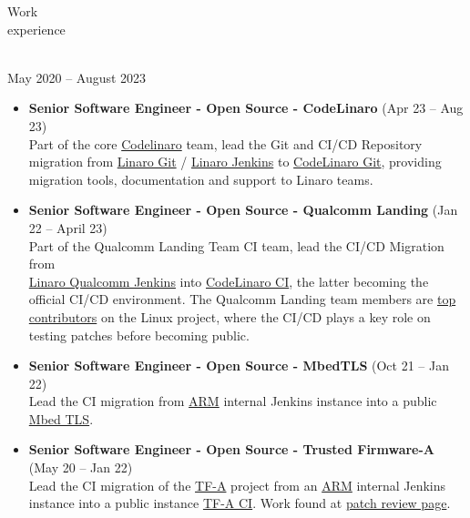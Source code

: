 \documentclass{resume}
\def\linaro{Linaro Limited}
\begin{document}
\begin{category}{Work \\experience}

  \citem{\linaro}\\
  May 2020 -- August 2023

  \begin{itemize}
  \item \textbf{Senior Software Engineer - Open Source - CodeLinaro} (Apr 23 -- Aug 23)\\
    Part of the core \href{www.codelinaro.org}{Codelinaro} team, lead the Git and CI/CD Repository migration
    from \href{git.linaro.org}{Linaro Git} / \href{ci.linaro.org}{Linaro Jenkins} to
    \href{git.codelinaro.org}{CodeLinaro Git}, providing migration tools, documentation and support to Linaro teams.
  \end{itemize}

  \begin{itemize}
  \item \textbf{Senior Software Engineer - Open Source - Qualcomm Landing} (Jan 22 -- April 23)\\
    Part of the Qualcomm Landing Team CI team, lead the CI/CD Migration from \\
    \href{https://ci.linaro.org/view/qclt/}{Linaro Qualcomm Jenkins} into
    \href{https://git.codelinaro.org/linaro/qcomlt/ci/configs}{CodeLinaro CI}, the latter becoming the official CI/CD environment.
    The Qualcomm Landing team members are \href{https://kernelnewbies.org/DevelopmentStatistics}{top contributors} on the Linux project,
    where the CI/CD plays a key role on testing patches before becoming public.
  \end{itemize}

  \begin{itemize}
  \item \textbf{Senior Software Engineer - Open Source - MbedTLS} (Oct 21 -- Jan 22)\\
    Lead the CI migration from \href{https://www.arm.com/}{ARM} internal Jenkins instance into a public \href{https://github.com/ARMmbed/mbedtls}{Mbed TLS}.
  \end{itemize}

  \begin{itemize}
  \item \textbf{Senior Software Engineer - Open Source - Trusted Firmware-A} (May 20 -- Jan 22)\\
    Lead the CI migration of the \href{https://www.trustedfirmware.org/projects/tf-a/}{TF-A}
    project from an \href{https://www.arm.com/}{ARM} internal Jenkins instance into a public instance \href{https://ci.trustedfirmware.org/}{TF-A CI}.
    Work found at \href{https://review.trustedfirmware.org/q/owner:leonardo.sandoval%2540linaro.org}{patch review page}.
  \end{itemize}


\end{category}
\end{document}
